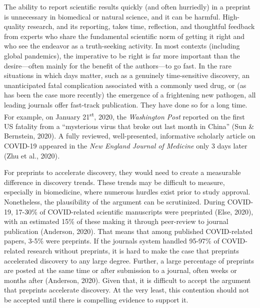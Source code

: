 \documentclass[authordate, perspective, issue]{jote-new-article}
\begin{document}
	The ability to report scientific results quickly (and often hurriedly) in a preprint is unnecessary in biomedical or natural science, and it can be harmful. High-quality research, and its reporting, takes time, reflection, and thoughtful feedback from experts who share the fundamental scientific norm of getting it right and who see the endeavor as a truth-seeking activity. In most contexts (including global pandemics), the imperative to be right is far more important than the desire—often mainly for the benefit of the authors—to go fast. In the rare situations in which days matter, such as a genuinely time-sensitive discovery, an unanticipated fatal complication associated with a commonly used drug, or (as has been the case more recently) the emergence of a frightening new pathogen, all leading journals offer fast-track publication. They have done so for a long time. For example, on January 21\textsuperscript{st}, 2020, the \emph{Washington Post }reported on the first US fatality from a “mysterious virus that broke out last month in China” (Sun \& Bernstein, 2020). A fully reviewed, well-presented, informative scholarly article on COVID-19 appeared in the \emph{New England Journal of Medicine }only 3 days later (Zhu et al., 2020)\emph{.}







	For preprints to accelerate discovery, they would need to create a measurable difference in discovery trends. These trends may be difficult to measure, especially in biomedicine, where numerous hurdles exist prior to study approval. Nonetheless, the plausibility of the argument can be scrutinized. During COVID-19, 17-30\% of COVID-related scientific manuscripts were preprinted (Else, 2020), with an estimated 15\% of these making it through peer-review to journal publication (Anderson, 2020). That means that among published COVID-related papers, 3-5\% were preprints. If the journals system handled 95-97\% of COVID-related research without preprints, it is hard to make the case that preprints accelerated discovery to any large degree. Further, a large percentage of preprints are posted at the same time or after submission to a journal, often weeks or months after (Anderson, 2020). Given that, it is difficult to accept the argument that preprints accelerate discovery. At the very least, this contention should not be accepted until there is compelling evidence to support it.
\end{document}
